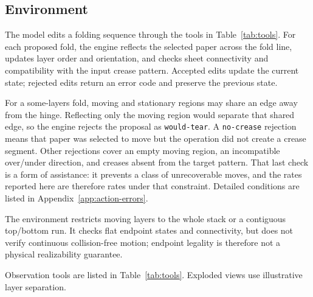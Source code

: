\subsection{Environment}
\label{sec:env}
\label{sec:env-one-object}
\label{sec:env-division}

The model edits a folding sequence through the tools in Table~\ref{tab:tools}. For each proposed
fold, the engine reflects the selected paper across the fold line, updates layer order and
orientation, and checks sheet connectivity and compatibility with the input crease pattern.
Accepted edits update the current state; rejected edits return an error code and preserve the
previous state.

\label{sec:env-refusals}
For a some-layers fold, moving and stationary regions may share an edge away from the hinge.
Reflecting only the moving region would separate that shared edge, so the engine rejects the
proposal as \texttt{would-tear}. A \texttt{no-crease} rejection means that paper was selected to
move but the operation did not create a crease segment. Other rejections cover an empty moving region, an incompatible over/under direction,
and creases absent from the target pattern. That last check is a form of assistance: it prevents a
class of unrecoverable moves, and the rates reported here are therefore rates under that
constraint. Detailed conditions are listed in
Appendix~\ref{app:action-errors}.

The environment restricts moving layers to the whole stack or a contiguous top/bottom run.
It checks flat endpoint states and connectivity, but does not verify continuous collision-free
motion; endpoint legality is therefore not a physical realizability guarantee.

\label{sec:env-observes}
Observation tools are listed in Table~\ref{tab:tools}. Exploded views use illustrative
layer separation.
